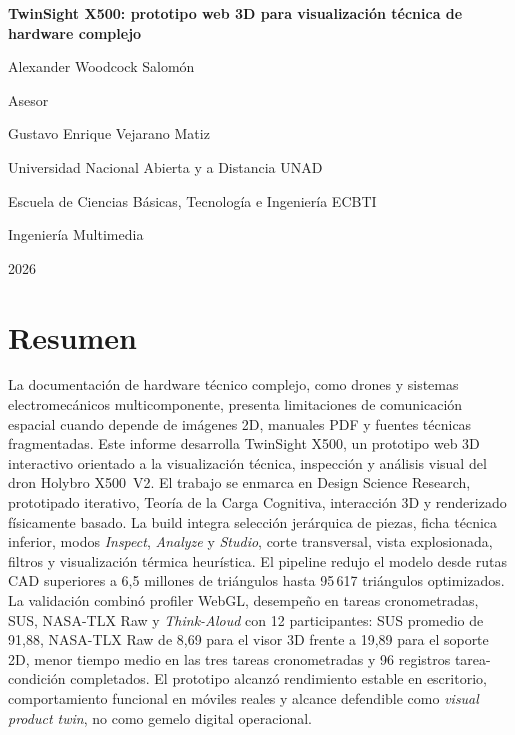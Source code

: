 \documentclass[12pt,letterpaper]{article}
\begin{document}
\thispagestyle{fancy}
\begin{center}
    \vspace*{2\baselineskip}
    {\normalfont\bfseries TwinSight X500: prototipo web 3D para visualización técnica de hardware complejo\par}
    \vfill
    {\normalfont Alexander Woodcock Salomón\par}
    \vspace{2\baselineskip}
    {\normalfont Asesor\par
    Gustavo Enrique Vejarano Matiz\par}
    \vfill
    {\normalfont Universidad Nacional Abierta y a Distancia UNAD\par
    Escuela de Ciencias Básicas, Tecnología e Ingeniería ECBTI\par
    Ingeniería Multimedia\par
    2026\par}
\end{center}

\section{Resumen}
\setlength{\parindent}{0pt}
La documentación de hardware técnico complejo, como drones y sistemas electromecánicos multicomponente, presenta limitaciones de comunicación espacial cuando depende de imágenes 2D, manuales PDF y fuentes técnicas fragmentadas. Este informe desarrolla TwinSight X500, un prototipo web 3D interactivo orientado a la visualización técnica, inspección y análisis visual del dron Holybro X500~V2. El trabajo se enmarca en Design Science Research, prototipado iterativo, Teoría de la Carga Cognitiva, interacción 3D y renderizado físicamente basado. La build integra selección jerárquica de piezas, ficha técnica inferior, modos \textit{Inspect}, \textit{Analyze} y \textit{Studio}, corte transversal, vista explosionada, filtros y visualización térmica heurística. El pipeline redujo el modelo desde rutas CAD superiores a 6,5 millones de triángulos hasta 95\,617 triángulos optimizados. La validación combinó profiler WebGL, desempeño en tareas cronometradas, SUS, NASA-TLX Raw y \textit{Think-Aloud} con 12 participantes: SUS promedio de 91,88, NASA-TLX Raw de 8,69 para el visor 3D frente a 19,89 para el soporte 2D, menor tiempo medio en las tres tareas cronometradas y 96 registros tarea-condición completados. El prototipo alcanzó rendimiento estable en escritorio, comportamiento funcional en móviles reales y alcance defendible como \textit{visual product twin}, no como gemelo digital operacional.
\end{document}

